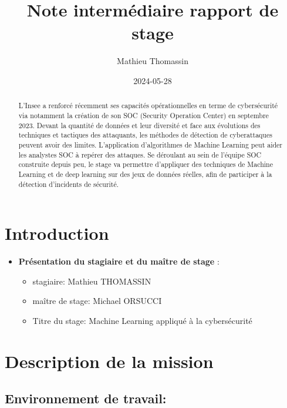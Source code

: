 \documentclass[
  letterpaper,
  DIV=11,
  numbers=noendperiod]{scrartcl}
\title{Note intermédiaire rapport de stage}
\author{Mathieu Thomassin}
\date{2024-05-28}
\providecommand{\tightlist}{%
  \setlength{\itemsep}{0pt}\setlength{\parskip}{0pt}}\usepackage{longtable,booktabs,array}
\renewcommand*\contentsname{Table of contents}
\newcommand\contentsname{Table of contents}
\begin{document}
\maketitle
\begin{abstract}
L'Insee a renforcé récemment ses capacités opérationnelles en terme de
cybersécurité via notamment la création de son SOC (Security Operation
Center) en septembre 2023. Devant la quantité de données et leur
diversité et face aux évolutions des techniques et tactiques des
attaquants, les méthodes de détection de cyberattaques peuvent avoir des
limites. L'application d'algorithmes de Machine Learning peut aider les
analystes SOC à repérer des attaques. Se déroulant au sein de l'équipe
SOC construite depuis peu, le stage va permettre d'appliquer des
techniques de Machine Learning et de deep learning sur des jeux de
données réelles, afin de participer à la détection d'incidents de
sécurité.
\end{abstract}

\renewcommand*\contentsname{Table of contents}
{
\hypersetup{linkcolor=}
\setcounter{tocdepth}{3}
\tableofcontents
}
\section{Introduction}\label{introduction}

\begin{itemize}
\tightlist
\item
  \textbf{Présentation du stagiaire et du maître de stage} :

  \begin{itemize}
  \tightlist
  \item
    stagiaire: Mathieu THOMASSIN
  \item
    maître de stage: Michael ORSUCCI
  \item
    Titre du stage: Machine Learning appliqué à la cybersécurité
  \end{itemize}
\end{itemize}

\section{Description de la mission}\label{description-de-la-mission}

\subsection{Environnement de travail:}\label{environnement-de-travail}
\end{document}

